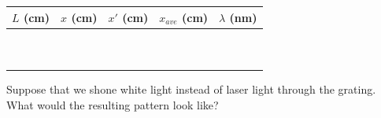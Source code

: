\answerspace{0.3cm}
\begin{center}
\begin{tabular}{|c|c|c|c|c|}
\hline 
\( L \) (cm)&
\( x \) (cm)&
\( x' \) (cm)&
\( x_{ave} \) (cm)&
\( \lambda  \) (nm)\\
\hline
\hline 
&
&
&
&
\\
&
&
&
&
\\
\hline 
&
&
&
&
\\
&
&
&
&
\\
\hline 
&
&
&
&
\\
&
&
&
&
\\
\hline 
&
&
&
&
\\
&
&
&
&
\\
\hline 
&
&
&
&
\\
&
&
&
&
\\
\hline
\end{tabular}\answerspace{0.3cm}

\end{center}


Suppose that we shone white light instead of laser light
through the grating.  What would the resulting pattern look
like?
